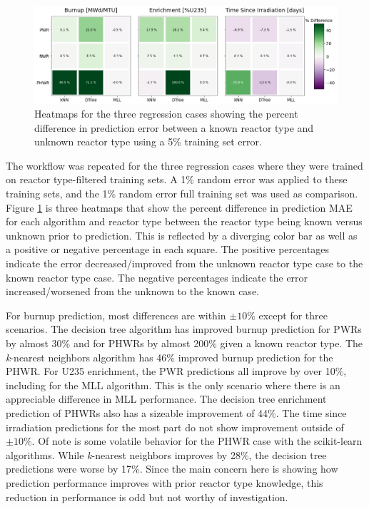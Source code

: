 \begin{figure}[!htb]
  \centering
  \includegraphics[width=\textwidth]{./chapters/exp1/rxtr-type_known-unknown_diff_err05.png}
  \caption{Heatmaps for the three regression cases showing the percent 
           difference in prediction error between a known reactor type 
           and unknown reactor type using a 5\% training set error.}
  \label{fig:knownrxtr}
\end{figure}

The workflow was repeated for the three regression cases where they were
trained on reactor type-filtered training sets. A 1\% random error was applied
to these training sets, and the 1\% random error full training set was used as
comparison.  Figure \ref{fig:knownrxtr} is three heatmaps that show the percent
difference in prediction \gls{MAE} for each algorithm and reactor type between
the reactor type being known versus unknown prior to prediction. This is
reflected by a diverging color bar as well as a positive or negative percentage
in each square.  The positive percentages indicate the error decreased/improved
from the unknown reactor type case to the known reactor type case.  The
negative percentages indicate the error increased/worsened from the unknown to
the known case. 


For burnup prediction, most differences are within $\pm10\%$ except for three
scenarios.  The decision tree algorithm has improved burnup prediction for
\gls{PWR}s by almost 30\% and for \gls{PHWR}s by almost 200\% given a known
reactor type.  The \textit{k}-nearest neighbors algorithm has 46\% improved
burnup prediction for the \gls{PHWR}. For \gls{U235} enrichment, the \gls{PWR}
predictions all improve by over 10\%, including for the \gls{MLL} algorithm.
This is the only scenario where there is an appreciable difference in \gls{MLL}
performance. The decision tree enrichment prediction of \gls{PHWR}s also has a
sizeable improvement of 44\%.  The time since irradiation predictions for the
most part do not show improvement outside of $\pm10\%$. Of note is some
volatile behavior for the \gls{PHWR} case with the scikit-learn algorithms.
While \textit{k}-nearest neighbors improves by 28\%, the decision tree
predictions were worse by 17\%. Since the main concern here is showing how
prediction performance improves with prior reactor type knowledge, this
reduction in performance is odd but not worthy of investigation. 

